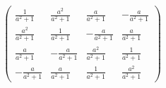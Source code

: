 \[ \left(\begin{array}{cccc} \frac{1}{a^2+1} & \frac{a^2}{a^2+1} &
\frac{a}{a^2+1} & -\frac{a}{a^2+1} \\ \frac{a^2}{a^2+1} &
\frac{1}{a^2+1} & -\frac{a}{a^2+1} & \frac{a}{a^2+1} \\
\frac{a}{a^2+1} & -\frac{a}{a^2+1} & \frac{a^2}{a^2+1} &
\frac{1}{a^2+1} \\ -\frac{a}{a^2+1} & \frac{a}{a^2+1} &
\frac{1}{a^2+1} & \frac{a^2}{a^2+1} \end{array}\right) \]

